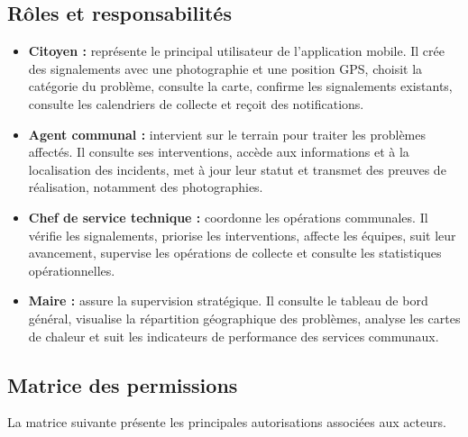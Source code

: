 \documentclass[11pt,a4paper,oneside]{report}
\begin{document}
	\subsection{Rôles et responsabilités}
	
	\begin{itemize}
		\item \textbf{Citoyen :}
		représente le principal utilisateur de l'application
		mobile. Il crée des signalements avec une photographie
		et une position GPS, choisit la catégorie du problème,
		consulte la carte, confirme les signalements existants,
		consulte les calendriers de collecte et reçoit des
		notifications.
		
		\item \textbf{Agent communal :}
		intervient sur le terrain pour traiter les problèmes
		affectés. Il consulte ses interventions, accède aux
		informations et à la localisation des incidents,
		met à jour leur statut et transmet des preuves
		de réalisation, notamment des photographies.
		
		\item \textbf{Chef de service technique :}
		coordonne les opérations communales. Il vérifie
		les signalements, priorise les interventions,
		affecte les équipes, suit leur avancement,
		supervise les opérations de collecte et consulte
		les statistiques opérationnelles.
		
		\item \textbf{Maire :}
		assure la supervision stratégique. Il consulte
		le tableau de bord général, visualise la répartition
		géographique des problèmes, analyse les cartes
		de chaleur et suit les indicateurs de performance
		des services communaux.
	\end{itemize}
	
	\subsection{Matrice des permissions}
	
	La matrice suivante présente les principales
	autorisations associées aux acteurs.
	
\end{document}
